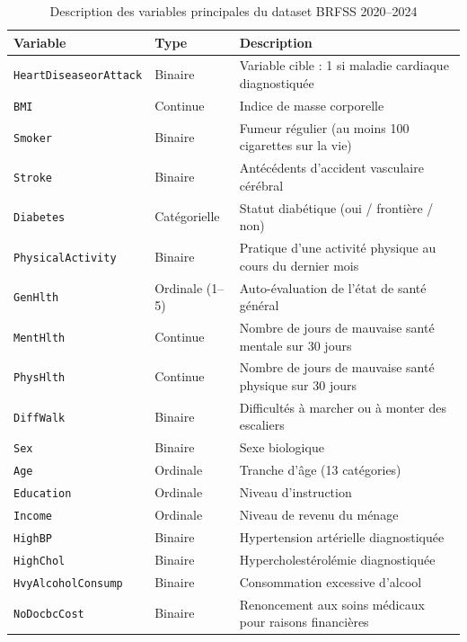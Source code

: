 \documentclass[12pt,a4paper]{report}
\begin{document}
\begin{table}[H]
\centering
\caption{Description des variables principales du dataset BRFSS 2020--2024}
\label{tab:description_variables}
\begin{tabularx}{\textwidth}{L{3.5cm} L{2.6cm} X}
\toprule
\textbf{Variable} & \textbf{Type} & \textbf{Description} \\
\midrule
\texttt{HeartDiseaseorAttack} & Binaire & Variable cible : 1 si maladie cardiaque diagnostiquée \\
\texttt{BMI} & Continue & Indice de masse corporelle \\
\texttt{Smoker} & Binaire & Fumeur régulier (au moins 100 cigarettes sur la vie) \\
\texttt{Stroke} & Binaire & Antécédents d'accident vasculaire cérébral \\
\texttt{Diabetes} & Catégorielle & Statut diabétique (oui / frontière / non) \\
\texttt{PhysicalActivity} & Binaire & Pratique d'une activité physique au cours du dernier mois \\
\texttt{GenHlth} & Ordinale (1--5) & Auto-évaluation de l'état de santé général \\
\texttt{MentHlth} & Continue & Nombre de jours de mauvaise santé mentale sur 30 jours \\
\texttt{PhysHlth} & Continue & Nombre de jours de mauvaise santé physique sur 30 jours \\
\texttt{DiffWalk} & Binaire & Difficultés à marcher ou à monter des escaliers \\
\texttt{Sex} & Binaire & Sexe biologique \\
\texttt{Age} & Ordinale & Tranche d'âge (13 catégories) \\
\texttt{Education} & Ordinale & Niveau d'instruction \\
\texttt{Income} & Ordinale & Niveau de revenu du ménage \\
\texttt{HighBP} & Binaire & Hypertension artérielle diagnostiquée \\
\texttt{HighChol} & Binaire & Hypercholestérolémie diagnostiquée \\
\texttt{HvyAlcoholConsump} & Binaire & Consommation excessive d'alcool \\
\texttt{NoDocbcCost} & Binaire & Renoncement aux soins médicaux pour raisons financières \\
\bottomrule
\end{tabularx}
\end{table}
\end{document}
